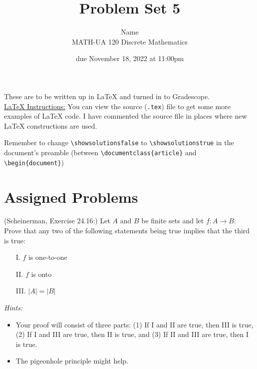 \documentclass{article}
\title{Problem Set 5}
\author{%
    Name
\\  MATH-UA 120 Discrete Mathematics
}
\date{due November 18, 2022 at 11:00pm}
\newif\ifshowsolutions
\newcommand{\danger}{\marginpar[\hfill\dbend]{\dbend\hfill}}
\theoremstyle{definition}
\begin{document}
\maketitle



These are to be written up in \LaTeX{} and turned in to Gradescope.\\



\ifshowsolutions
    \SetupExSheets{solution/print=true}
\else
    \danger
 \underline{ \LaTeX{}  Instructions:}  You can view the source (\texttt{.tex}) file to get some more examples of \LaTeX{} code.  I have commented the source file in places where new \LaTeX{} constructions are used.
  
  Remember to change \verb|\showsolutionsfalse| to \verb|\showsolutionstrue|
    in the document's preamble 
    (between \verb|\documentclass{article}| and \verb|\begin{document}|)
\fi

\section*{Assigned Problems}

\begin{question}
    (Scheinerman, Exercise 24.16:) 
    Let $A$ and $B$ be finite sets and let $f: A \rightarrow B$.  Prove that any two of the following statements being true implies that the third is true:
	\begin{itemize}
	\item[I.] $f$ is one-to-one
	\item[II.] $f$ is onto
	\item[III.] $|A| = |B|$
	\end{itemize}

	{\it Hints:}
	\begin{itemize}
	\item Your proof will consist of three parts: (1) If I and II are true, then III is true, (2) If I and III are true, then II is true, and (3) If II and III are true, then I is true.
	\item The pigeonhole principle might help.
	\end{itemize}
\end{question}
\begin{solution}
\end{solution}
\end{document}
